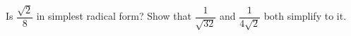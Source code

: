 Is $\dfrac{\sqrt2}{8}$ in simplest radical form? Show that $\dfrac{1}{\sqrt{32}}$ and $\dfrac{1}{4\sqrt2}$ both simplify to it.
